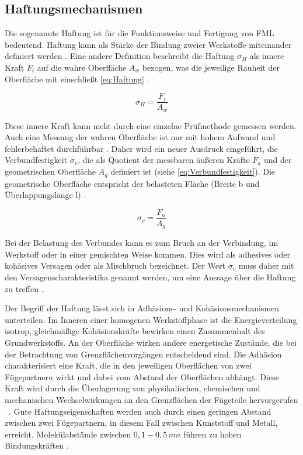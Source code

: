 \subsection{Haftungsmechanismen}\label{sec:Haftung}


Die sogenannte Haftung ist für die Funktionsweise und Fertigung von FML bedeutend.
Haftung kann als Stärke der Bindung zweier Werkstoffe miteinander definiert werden \cite{Mann.1994}.
Eine andere Definition beschreibt die Haftung $\sigma_H$ als innere Kraft $F_i$ auf die wahre Oberfläche $A_w$ bezogen, was die jeweilige Rauheit der Oberfläche mit einschließt \autoref{eq:Haftung} \cite{Bischof.1993}.

\begin{equation}
\sigma_H = \frac{F_i}{A_w}
\label{eq:Haftung}
\end{equation}

Diese innere Kraft kann nicht durch eine einzelne Prüfmethode gemessen werden.
Auch eine Messung der wahren Oberfläche ist nur mit hohem Aufwand und fehlerbehaftet durchführbar \cite{Brockmann.1969}.
Daher wird ein neuer Ausdruck eingeführt, die Verbundfestigkeit $\sigma_v$, die als Quotient der messbaren äußeren Kräfte $F_a$ und der geometrischen Oberfläche $A_g$ definiert ist (siehe \autoref{eq:Verbundfestigkeit}).
Die geometrische Oberfläche entspricht der belasteten Fläche (Breite b und Überlappungslänge l) \cite{Habenicht.2009}.

\begin{equation}
\sigma_v = \frac{F_a}{A_g}
\label{eq:Verbundfestigkeit}
\end{equation}

Bei der Belastung des Verbundes kann es zum Bruch an der Verbindung, im  Werkstoff oder in einer gemischten Weise kommen.
Dies wird als adhesives oder kohäsives Versagen oder als Mischbruch bezeichnet.
Der Wert $\sigma_v$ muss daher mit den Versagenscharakteristika genannt werden, um eine Aussage über die Haftung zu treffen \cite{Pan.2016}.

Der Begriff der Haftung lässt sich in Adhäsions- und Kohäsionsmechanismen unterteilen.
Im Inneren einer homogenen Werkstoffphase ist die Energieverteilung isotrop, gleichmäßige Kohäsionskräfte bewirken einen Zusammenhalt des Grundwerkstoffs.
An der Oberfläche wirken andere energetische Zustände, die bei der Betrachtung von Grenzflächenvorgängen entscheidend sind.
Die Adhäsion charakterisiert eine Kraft, die in den jeweiligen Oberflächen von zwei Fügepartnern wirkt und dabei vom Abstand der Oberflächen abhängt.
Diese Kraft wird durch die Überlagerung von physikalischen, chemischen und mechanischen Wechselwirkungen an den Grenzflächen der Fügeteile hervorgerufen \cite{Habenicht.2009}~.
Gute Haftungseigenschaften werden auch durch einen geringen Abstand zwischen zwei Fügepartnern, in diesem Fall zwischen Kunststoff und Metall, erreicht.
Molekülabstände zwischen $0,1 - 0,5\, nm$ führen zu hohen Bindungskräften \cite{Suchentrunk.2007}.

